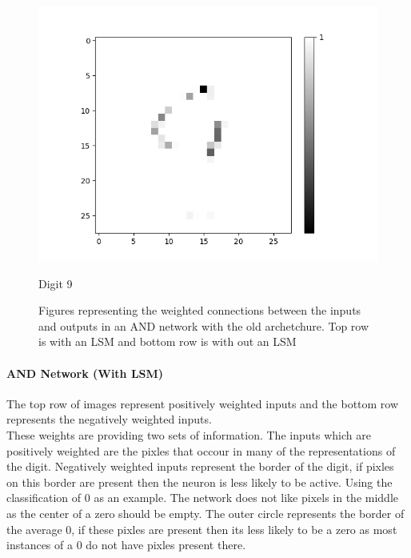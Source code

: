 \begin{figure}[H]
\begin{minipage}[b]{0.19\textwidth}
		\includegraphics[width=\textwidth]{AND-OLD(NO-LSM)/Layer0-Neuron-9.png}
		\caption{Digit 9}
	\end{minipage}
	\hfill
	\caption{Figures representing the weighted connections between the inputs and outputs in an AND network with the old archetchure. Top row is with an LSM and bottom row is with out an LSM}
\end{figure}

\paragraph{AND Network (With LSM)}
The top row of images represent positively weighted inputs and the bottom row represents the negatively weighted inputs.\\

These weights are providing two sets of information. The inputs which are positively weighted are the pixles that occour in many of the representations of the digit. Negatively weighted inputs represent the border of the digit, if pixles on this border are present then the neuron is less likely to be active. Using the classification of 0 as an example. The network does not like pixels in the middle as the center of a zero should be empty. The outer circle represents the border of the average 0, if these pixles are present then its less likely to be a zero as most instances of a 0 do not have pixles present there.

